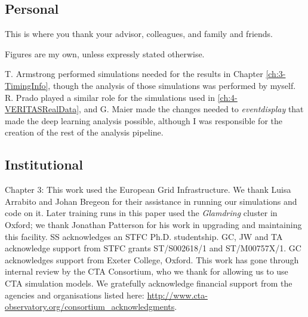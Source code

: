 \subsection*{Personal}

This is where you thank your advisor, colleagues, and family and friends.

Figures are my own, unless expressly stated otherwise. 

T. Armstrong performed simulations needed for the results in Chapter \ref{ch:3-TimingInfo}, though the analysis of those simulations was performed by myself. R. Prado played a similar role for the simulations used in \ref{ch:4-VERITASRealData}, and G. Maier made the changes needed to \textit{eventdisplay} that made the deep learning analysis possible, although I was responsible for the creation of the rest of the analysis pipeline.


\subsection*{Institutional}

Chapter 3: This work used the European Grid Infrastructure. We thank Luisa Arrabito and Johan Bregeon for their assistance in running our simulations and code on it. Later training runs in this paper used the \textit{Glamdring} cluster in Oxford; we thank Jonathan Patterson for his work in upgrading and maintaining this facility. SS acknowledges an STFC Ph.D. studentship. GC, JW and TA acknowledge support from STFC grants ST/S002618/1 and ST/M00757X/1. GC acknowledges support from Exeter College, Oxford. This work has gone through internal review by the CTA Consortium, who we thank for allowing us to use CTA simulation models. We gratefully acknowledge financial support from the agencies and organisations listed here: \url{http://www.cta-observatory.org/consortium\_acknowledgments}.